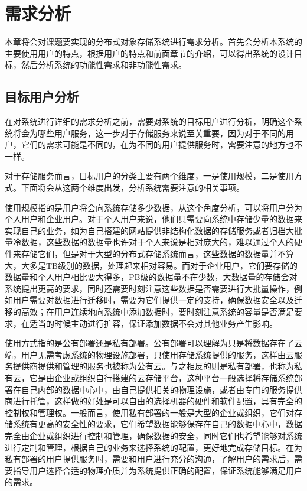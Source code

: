 
\chapter{需求分析}
本章将会对课题要实现的分布式对象存储系统进行需求分析。首先会分析本系统的主要使用用户的特点，根据用户的特点和前面章节的介绍，可以得出系统的设计目标，然后分析系统的功能性需求和非功能性需求。

\section{目标用户分析}
在对系统进行详细的需求分析之前，需要对系统的目标用户进行分析，明确这个系统将会为哪些用户服务，这一步对于存储服务来说至关重要，因为对于不同的用户，它们的需求可能是不同的，在为不同的用户提供服务时，需要注意的地方也不一样。

对于存储服务而言，目标用户的分类主要有两个维度，一是使用规模，二是使用方式。下面将会从这两个维度出发，分析系统需要注意的相关事项。

使用规模指的是用户将会向系统存储多少数据，从这个角度分析，可以将用户分为个人用户和企业用户。对于个人用户来说，他们只需要向系统中存储少量的数据来实现自己的业务，如为自己搭建的网站提供非结构化数据的存储服务或者归档大批量冷数据，这些数据的数据量也许对于个人来说是相对庞大的，难以通过个人的硬件来存储它们，但是对于大型的分布式存储系统而言，这些数据的数据量并不算大，大多是TB级别的数据，处理起来相对容易。而对于企业用户，它们要存储的数据量和个人用户相比要大得多，PB级的数据量不在少数，大数据量的存储会对系统提出更高的要求，同时还需要时刻注意这些数据是否需要进行大批量操作，例如用户需要对数据进行迁移时，需要为它们提供一定的支持，确保数据安全以及迁移的高效；在用户连续地向系统中添加数据时，要时刻注意系统的容量是否满足要求，在适当的时候主动进行扩容，保证添加数据不会对其他业务产生影响。

使用方式指的是公有部署还是私有部署。公有部署可以理解为只是将数据存在了云端，用户无需考虑系统的物理设施部署，只使用存储系统提供的服务，这样由云服务提供商提供和管理的服务也被称为公有云。与之相反的则是私有部署，也称为私有云，它是由企业或组织自行搭建的云存储平台，这种平台一般选择将存储系统部署在自己内部的数据中心中，由自己提供相关的物理设施，或者由专门的服务提供商进行托管，这样做的好处是可以自由的选择机器的硬件和软件配置，具有完全的控制权和管理权。一般而言，使用私有部署的一般是大型的企业或组织，它们对存储系统有更高的安全性的要求，它们希望数据能够保存在自己的数据中心中，数据完全由企业或组织进行控制和管理，确保数据的安全，同时它们也希望能够对系统进行定制和管理，根据自己的业务来选择系统的配置，更好地完成存储目标。在为私有部署的用户提供服务时，需要和用户进行充分的沟通，了解用户的需求后，需要指导用户选择合适的物理介质并为系统提供正确的配置，保证系统能够满足用户的需求。

